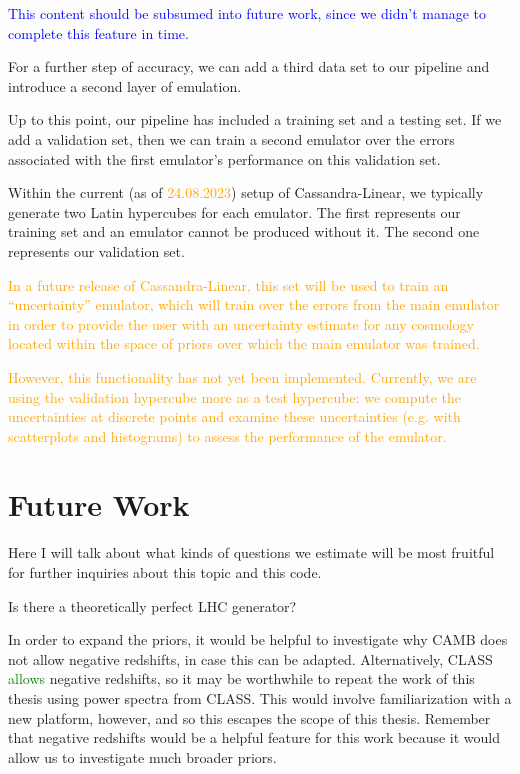 \textcolor{blue}{This content should be subsumed into future work, since we
didn't manage to complete this feature in time.}

For a further step of accuracy, we can add a third data set to our pipeline
and introduce a second layer of emulation.

Up to this point, our pipeline has included a training set and a testing set.
If we add a validation set, then we can train a second emulator over the
errors associated with the first emulator's performance on this validation
set.

Within the current (as of \textcolor{orange}{24.08.2023}) setup of
Cassandra-Linear, we typically generate two Latin hypercubes for each
emulator. The first represents our training set and an emulator cannot be
produced without it. The second one represents our validation set.

\textcolor{orange}{In a future
release of Cassandra-Linear, this set will be used to train an ``uncertainty''
emulator, which will train over the errors from the main emulator in order to
provide the user with an uncertainty estimate for any cosmology located within
the space of priors over which the main emulator was trained.} 

\textcolor{orange}{However, this functionality has not yet been implemented. 
Currently, we are 
using the validation hypercube more as a test hypercube: we compute the 
uncertainties at discrete points and examine these uncertainties (e.g. with
scatterplots and histograms) to assess the performance of the emulator.}


\section{Future Work}
\label{sec: future_work}

Here I will talk about what kinds of questions we estimate will be most 
fruitful for further inquiries about this topic and this code.


Is there a theoretically perfect LHC generator?


In order to expand the priors, it would be helpful to investigate why CAMB 
does not allow negative redshifts, in case this can be adapted. Alternatively, 
CLASS \textcolor{green}{allows} negative redshifts, so it may be worthwhile to 
repeat the work of this thesis using power spectra from CLASS. This would 
involve familiarization with a new platform, however, and so this escapes the 
scope of this thesis. Remember that negative redshifts would be a helpful 
feature for this work because it would allow us to investigate much broader 
priors.

